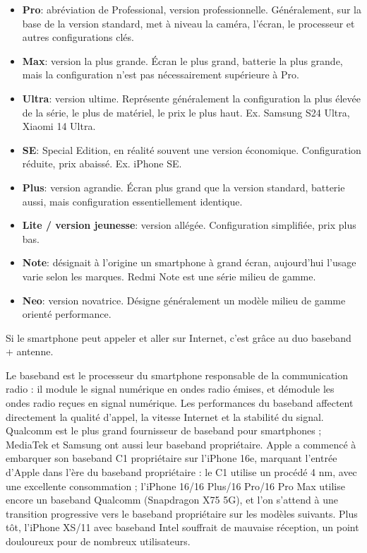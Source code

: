 
\begin{itemize}
  \item \textbf{Pro}: abréviation de Professional, version professionnelle. Généralement, sur la base de la version standard, met à niveau la caméra, l'écran, le processeur et autres configurations clés.
  \item \textbf{Max}: version la plus grande. Écran le plus grand, batterie la plus grande, mais la configuration n'est pas nécessairement supérieure à Pro.
  \item \textbf{Ultra}: version ultime. Représente généralement la configuration la plus élevée de la série, le plus de matériel, le prix le plus haut. Ex. Samsung S24 Ultra, Xiaomi 14 Ultra.
  \item \textbf{SE}: Special Edition, en réalité souvent une version économique. Configuration réduite, prix abaissé. Ex. iPhone SE.
  \item \textbf{Plus}: version agrandie. Écran plus grand que la version standard, batterie aussi, mais configuration essentiellement identique.
  \item \textbf{Lite / version jeunesse}: version allégée. Configuration simplifiée, prix plus bas.
  \item \textbf{Note}: désignait à l'origine un smartphone à grand écran, aujourd'hui l'usage varie selon les marques. Redmi Note est une série milieu de gamme.
  \item \textbf{Neo}: version novatrice. Désigne généralement un modèle milieu de gamme orienté performance.
\end{itemize}


Si le smartphone peut appeler et aller sur Internet, c'est grâce au duo baseband + antenne.


Le baseband est le processeur du smartphone responsable de la communication radio : il module le signal numérique en ondes radio émises, et démodule les ondes radio reçues en signal numérique. Les performances du baseband affectent directement la qualité d'appel, la vitesse Internet et la stabilité du signal. Qualcomm est le plus grand fournisseur de baseband pour smartphones ; MediaTek et Samsung ont aussi leur baseband propriétaire. Apple a commencé à embarquer son baseband C1 propriétaire sur l'iPhone 16e, marquant l'entrée d'Apple dans l'ère du baseband propriétaire : le C1 utilise un procédé 4 nm, avec une excellente consommation ; l'iPhone 16/16 Plus/16 Pro/16 Pro Max utilise encore un baseband Qualcomm (Snapdragon X75 5G), et l'on s'attend à une transition progressive vers le baseband propriétaire sur les modèles suivants. Plus tôt, l'iPhone XS/11 avec baseband Intel souffrait de mauvaise réception, un point douloureux pour de nombreux utilisateurs.

